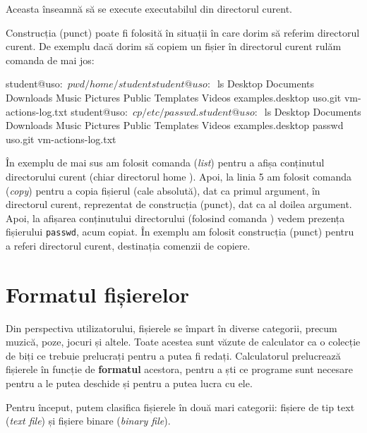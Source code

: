 
Aceasta înseamnă să se execute executabilul  din directorul curent.

Construcția  (punct) poate fi folosită în situații în care dorim să referim directorul curent. De exemplu dacă dorim să copiem un fișier în directorul curent rulăm comanda de mai jos:

\begin{screen}
student@uso:~$ pwd
/home/student
student@uso:~$ ls
Desktop  Documents  Downloads  Music  Pictures  Public  Templates  Videos  examples.desktop  uso.git  vm-actions-log.txt
student@uso:~$ cp /etc/passwd .
student@uso:~$ ls
Desktop  Documents  Downloads  Music  Pictures  Public  Templates  Videos  examples.desktop  passwd  uso.git  vm-actions-log.txt
\end{screen}

În exemplu de mai sus am folosit comanda  (\textit{list}) pentru a afișa conținutul directorului curent (chiar directorul home ). Apoi, la linia 5 am folosit comanda  (\textit{copy}) pentru a copia fișierul  (cale absolută), dat ca primul argument, în directorul curent, reprezentat de construcția  (punct), dat ca al doilea argument. Apoi, la afișarea conținutului directorului (folosind comanda ) vedem prezența fișierului \texttt{passwd}, acum copiat. În exemplu am folosit construcția  (punct) pentru a referi directorul curent, destinația comenzii de copiere.

\section{Formatul fișierelor}
\label{sec:file-system-format}

Din perspectiva utilizatorului, fișierele se împart în diverse categorii, precum
muzică, poze, jocuri și altele. Toate acestea sunt văzute de calculator ca o
colecție de biți ce trebuie prelucrați pentru a putea fi redați. Calculatorul
prelucrează fișierele în funcție de \textbf{formatul} acestora, pentru a ști ce
programe sunt necesare pentru a le putea deschide și pentru a putea lucra cu
ele.

Pentru început, putem clasifica fișierele în două mari categorii: fișiere de tip
text (\textit{text file}) și fișiere binare (\textit{binary file}).

